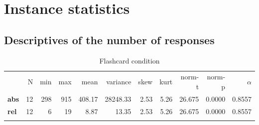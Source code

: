 \chapter{Instance statistics}

\FloatBarrier
\section{Descriptives of the number of responses}

\begin{longtable}[c]{@{}lrrrrrrrrrr@{}}
\caption{Flashcard condition}
\endfirsthead
\endhead
\toprule\addlinespace
& N & min & max & mean & variance & skew & kurt & norm-t &
norm-p & $\alpha$
\\\addlinespace
\midrule
\textbf{abs} & 12 & 298 & 915 & 408.17 & 28248.33 & 2.53 & 5.26 & 26.675
& 0.0000 & 0.8557
\\\addlinespace
\textbf{rel} & 12 & 6 & 19 & 8.87 & 13.35 & 2.53 & 5.26 & 26.675 &
0.0000 & 0.8557
\\\addlinespace
\bottomrule
    \label{tab:responses_fc}
\end{longtable}

